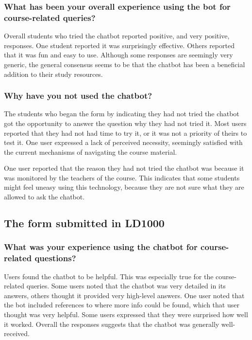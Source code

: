 \subsubsection{What has been your overall experience using the bot for course-related queries?}


Overall students who tried the chatbot reported positive, and very positive, responses. One student reported it was surprisingly effective. Others reported that it was fun and easy to use. Although some responses are seemingly very generic, the general consensus seems to be that the chatbot has been a beneficial addition to their study resources.


\subsubsection{Why have you not used the chatbot?}


The students who began the form by indicating they had not tried the chatbot got the opportunity to answer the question why they had not tried it. Most users reported that they had not had time to try it, or it was not a priority of theirs to test it. One user expressed a lack of perceived necessity, seemingly satisfied with the current mechanisms of navigating the course material.


One user reported that the reason they had not tried the chatbot was because it was monitored by the teachers of the course. This indicates that some students might feel uneasy using this technology, because they are not sure what they are allowed to ask the chatbot.


\subsection{The form submitted in LD1000}


\subsubsection{What was your experience using the chatbot for course-related questions?}


Users found the chatbot to be helpful. This was especially true for the course-related queries. Some users noted that the chatbot was very detailed in its answers, others thought it provided very high-level answers. One user noted that the bot included references to where more info could be found, which that user thought was very helpful. Some users expressed that they were surprised how well it worked. Overall the responses suggests that the chatbot was generally well-received.


